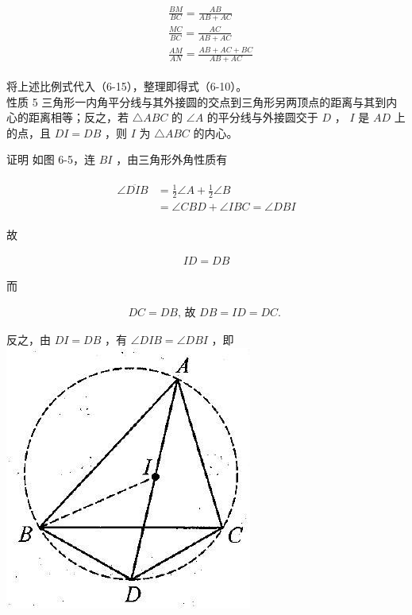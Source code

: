 \documentclass[10pt]{article}
\begin{document}
\begin{align*}
\begin{aligned}
& \frac{B M}{B C}=\frac{A B}{A B+A C} \\
& \frac{M C}{B C}=\frac{A C}{A B+A C} \\
& \frac{A M}{A N}=\frac{A B+A C+B C}{A B+A C}
\end{aligned}
\end{align*}

将上述比例式代入（6-15），整理即得式（6-10）。\\
性质 5 三角形一内角平分线与其外接圆的交点到三角形另两顶点的距离与其到内心的距离相等；反之，若 $\triangle A B C$ 的 $\angle A$ 的平分线与外接圆交于 $D$ ， $I$ 是 $A D$ 上的点，且 $D I=D B$ ，则 $I$ 为 $\triangle A B C$ 的内心。

证明 如图 6-5，连 $B I$ ，由三角形外角性质有

\begin{align*}
\begin{aligned}
\angle \ddot{D I B} & =\frac{1}{2} \angle A+\frac{1}{2} \angle B \\
& =\angle C B D+\angle I B C=\angle D B I
\end{aligned}
\end{align*}

故

\begin{align*}
I D=D B
\end{align*}

而

\begin{align*}
D C=D B \text {, 故 } D B=I D=D C \text {. }
\end{align*}

反之，由 $D I=D B$ ，有 $\angle D I B=\angle D B I$ ，即\\
\includegraphics[max width=\textwidth, center]{2024_10_30_2c8f45efd4a519b08e1ag-061}
\end{document}
